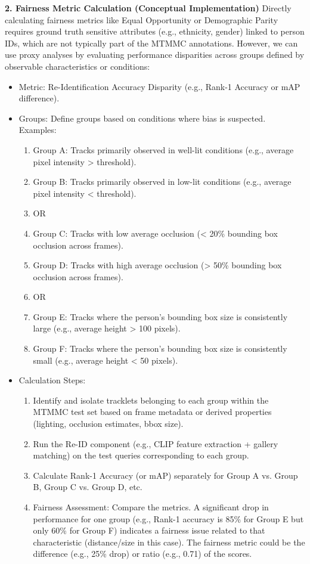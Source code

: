 \textbf{2. Fairness Metric Calculation (Conceptual Implementation)}
Directly calculating fairness metrics like Equal Opportunity or Demographic Parity requires ground truth sensitive attributes (e.g., ethnicity, gender) linked to person IDs, which are not typically part of the MTMMC annotations. However, we can use proxy analyses by evaluating performance disparities across groups defined by observable characteristics or conditions:
\begin{itemize}
    \item Metric: Re-Identification Accuracy Disparity (e.g., Rank-1 Accuracy or mAP difference).
    \item Groups: Define groups based on conditions where bias is suspected. Examples:
    \begin{enumerate}
        \item Group A: Tracks primarily observed in well-lit conditions (e.g., average pixel intensity > threshold).
        \item Group B: Tracks primarily observed in low-lit conditions (e.g., average pixel intensity < threshold).
        \item OR
        \item Group C: Tracks with low average occlusion (< 20\% bounding box occlusion across frames).
        \item Group D: Tracks with high average occlusion (> 50\% bounding box occlusion across frames).
        \item OR
        \item Group E: Tracks where the person's bounding box size is consistently large (e.g., average height > 100 pixels).
        \item Group F: Tracks where the person's bounding box size is consistently small (e.g., average height < 50 pixels).
    \end{enumerate}
    \item Calculation Steps:
    \begin{enumerate}
        \item Identify and isolate tracklets belonging to each group within the MTMMC test set based on frame metadata or derived properties (lighting, occlusion estimates, bbox size).
        \item Run the Re-ID component (e.g., CLIP feature extraction + gallery matching) on the test queries corresponding to each group.
        \item Calculate Rank-1 Accuracy (or mAP) separately for Group A vs. Group B, Group C vs. Group D, etc.
        \item Fairness Assessment: Compare the metrics. A significant drop in performance for one group (e.g., Rank-1 accuracy is 85\% for Group E but only 60\% for Group F) indicates a fairness issue related to that characteristic (distance/size in this case). The fairness metric could be the difference (e.g., 25\% drop) or ratio (e.g., 0.71) of the scores.
    \end{enumerate}
\end{itemize}

